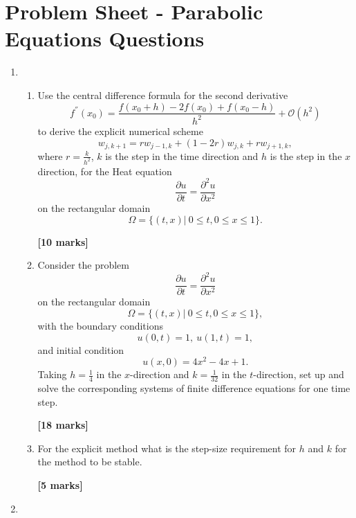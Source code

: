 \section{ Problem Sheet - Parabolic Equations Questions}
\begin{enumerate}
\subsection{Explicit Equations}
	\item 
\begin{enumerate}
	
	\item 
	Use the central difference formula for the second derivative 
	\[ f^{''}(x_0)=\frac{f(x_0+h)-2f(x_0)+f(x_0-h)}{h^2}+\mathcal{O}(h^2)\]
	to derive the explicit numerical scheme
	\[w_{j,k+1}=rw_{j-1,k}+(1-2r)w_{j,k}+rw_{j+1,k},\]
	where $r=\frac{k}{h^2}$, $k$ is the step in the time direction and $h$ is the step in the $x$ direction, 
	for the Heat equation 
	\[\frac{\partial u}{\partial t}=\frac{\partial^2 u}{\partial x^2} \]
	on the rectangular domain
	\[\Omega=\{(t,x)| \ 0\leq t, 0 \leq x \leq 1\}. \]
\begin{flushright}
\textbf{[10 marks]}
\end{flushright}
	
	\item Consider the problem
	\[\frac{\partial u}{\partial t}=\frac{\partial^2 u}{\partial x^2} \]
	on the rectangular domain
	\[\Omega=\{(t,x)| \ 0\leq t, 0 \leq x \leq 1\}, \]
	with the boundary conditions
	\[ u(0,t)=1, \ u(1,t)=1,   \]
	and initial condition
	\[	u(x,0)=4x^2-4x+1.\]
		Taking $h=\frac{1}{4}$ in the $x$-direction and $k=\frac{1}{32}$ in the $t$-direction, set up and solve the corresponding systems of finite difference equations for one time step.\\
\begin{flushright}
\textbf{[18 marks]}
\end{flushright}
	\item
	For the explicit method what is the step-size requirement for $h$ and $k$ for the method to be stable.
\begin{flushright}
\textbf{[5 marks]}
\end{flushright}
	
	
\end{enumerate}

	\item 
\begin{enumerate}
	

\end{enumerate}
\end{enumerate}
